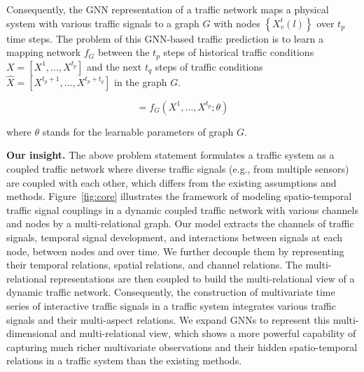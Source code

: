 Consequently, the GNN representation of a traffic network maps a physical system with various traffic signals to a graph $G$ with nodes $\left\{X_v^{t}(l)\right\}$ over $t_p$ time steps. The problem of this GNN-based traffic prediction is to learn a mapping network $f_G$ between the $t_p$ steps of historical traffic conditions $X = [X^1,\dots, X^{t_p}]$ and the next $t_q$ steps of traffic conditions $\hat{X} = [X^{t_p + 1},\dots, X^{t_p + t_q}]$ in the graph $G$.

\begin{equation}
    [X^{t_p + 1}, \dots , X^{t_p + t_q}] = f_G(X^1, \dots, X^{t_p};\theta)
    \label{eqn:target_function}
\end{equation}

where $\theta$ stands for the learnable parameters of graph $G$.

\textbf{Our insight.} The above problem statement formulates a traffic system as a coupled traffic network where diverse traffic signals (e.g., from multiple sensors) are coupled with each other, which differs from the existing assumptions and methods. Figure~\ref{fig:core} illustrates the framework of modeling spatio-temporal traffic signal couplings in a dynamic coupled traffic network with various channels and nodes by a multi-relational graph. Our model extracts the channels of traffic signals, temporal signal development, and interactions between signals at each node, between nodes and over time. We further decouple them by representing their temporal relations, spatial relations, and channel relations. The multi-relational representations are then coupled to build the multi-relational view of a dynamic traffic network. Consequently, the construction of multivariate time series of interactive traffic signals in a traffic system integrates various traffic signals and their multi-aspect relations. We expand GNNs to represent this multi-dimensional and multi-relational view, which shows a more powerful capability of capturing much richer multivariate observations and their hidden spatio-temporal relations in a traffic system than the existing methods.

